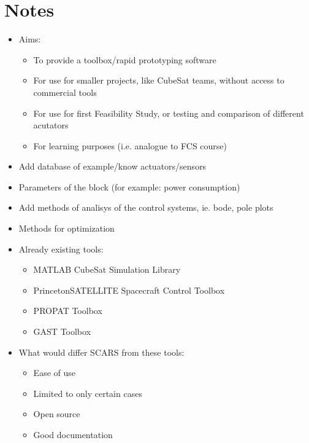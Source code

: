 \section*{Notes}
\begin{itemize}
    \item Aims:
    \begin{itemize}
        \item To provide a toolbox/rapid prototyping software
        \item For use for smaller projects, like CubeSat teams, without access to commercial tools
        \item For use for first Feasibility Study, or testing and comparison of different acutators
        \item For learning purposes (i.e. analogue to FCS course) 
    \end{itemize}
    \item Add database of example/know actuators/sensors
    \item Parameters of the block (for example: power consumption)
    \item Add methods of analisys of the control systems, ie. bode, pole plots 
    \item Methods for optimization
    \item Already existing tools:
    \begin{itemize}
            \item MATLAB CubeSat Simulation Library
            \item PrincetonSATELLITE Spacecraft Control Toolbox
            \item PROPAT Toolbox
            \item GAST Toolbox
          \end{itemize}
    \item What would differ SCARS from these tools:
    \begin{itemize}
            \item Ease of use
            \item Limited to only certain cases
            \item Open source
            \item Good documentation
        \end{itemize}
\end{itemize}